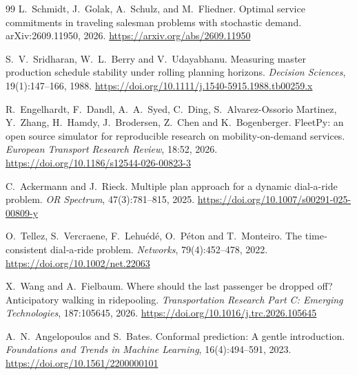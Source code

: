 \begin{thebibliography}{99}
L.~Schmidt, J.~Golak, A.~Schulz, and M.~Fliedner.
\newblock Optimal service commitments in traveling salesman problems with stochastic demand.
\newblock arXiv:2609.11950, 2026.
\newblock \url{https://arxiv.org/abs/2609.11950}

S.~V.~Sridharan, W.~L.~Berry and V.~Udayabhanu.
\newblock Measuring master production schedule stability under rolling planning horizons.
\newblock \emph{Decision Sciences}, 19(1):147--166, 1988.
\newblock \url{https://doi.org/10.1111/j.1540-5915.1988.tb00259.x}

R.~Engelhardt, F.~Dandl, A.~A.~Syed, C.~Ding, S.~Alvarez-Ossorio Martinez, Y.~Zhang, H.~Hamdy, J.~Brodersen, Z.~Chen and K.~Bogenberger.
\newblock FleetPy: an open source simulator for reproducible research on mobility-on-demand services.
\newblock \emph{European Transport Research Review}, 18:52, 2026.
\newblock \url{https://doi.org/10.1186/s12544-026-00823-3}

C.~Ackermann and J.~Rieck.
\newblock Multiple plan approach for a dynamic dial-a-ride problem.
\newblock \emph{OR Spectrum}, 47(3):781--815, 2025.
\newblock \url{https://doi.org/10.1007/s00291-025-00809-y}

O.~Tellez, S.~Vercraene, F.~Lehuédé, O.~Péton and T.~Monteiro.
\newblock The time‐consistent dial‐a‐ride problem.
\newblock \emph{Networks}, 79(4):452--478, 2022.
\newblock \url{https://doi.org/10.1002/net.22063}

X.~Wang and A.~Fielbaum.
\newblock Where should the last passenger be dropped off? Anticipatory walking in ridepooling.
\newblock \emph{Transportation Research Part C: Emerging Technologies}, 187:105645, 2026.
\newblock \url{https://doi.org/10.1016/j.trc.2026.105645}

A.~N.~Angelopoulos and S.~Bates.
\newblock Conformal prediction: A gentle introduction.
\newblock \emph{Foundations and Trends in Machine Learning}, 16(4):494--591, 2023.
\newblock \url{https://doi.org/10.1561/2200000101}

\end{thebibliography}


